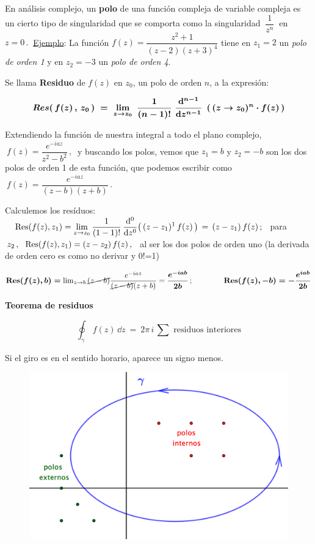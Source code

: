 En análisis complejo, un \textbf{polo} de una función compleja de variable compleja es un cierto tipo de singularidad que se comporta como la singularidad $\ \dfrac 1 {z^n} \ $ en $z = 0\, .  \ $ 
\underline{Ejemplo}: La función $f(z)=\dfrac{z^2+1}{(z-2)(z+3)^4}$ tiene en $z_1=2$ un \emph{polo de orden 1} y en $z_2=-3$ un \emph{polo de orden 4}.


Se llama \textbf{Residuo} de $f(z)$  en $z_0$, un polo de orden $n$, a la expresión:

$$\boldsymbol{ Res(\, f(z)\, , \, z_0\, ) \ = \ \lim_{z\to z_0}\ \dfrac 1{(n-1)!}\ \dv[n-1]{z} \ \left( \, (z \to z_0)^n \cdot f(z) \, \right) } $$

Extendiendo la función de nuestra integral a todo el plano complejo, $\ f(z)=\dfrac{e^{-iaz}}{z^2-b^2} \, , \ $ y buscando los polos, vemos que $z_1=b$ y $z_2=-b$ son los dos polos de orden 1 de esta función, que podemos escribir como $ \ f(z)=\dfrac{e^{-iaz}}{(z-b)(z+b)}\, .$

Calculemos los resíduos: $\quad \displaystyle \Res(f(z),z_1)=\lim_{z \to z_0} \dfrac 1{(1-1)!}\, \dv[0]{z} (\, (z-z_1)^1\, f(z) \, ) \, = \, (z-z_1)\, f(z)\, ; \ $ para $z_2\, , \ \ \Res(f(z),z_1) =  (z-z_2)\, f(z) \, , \ $ al ser los dos polos de orden uno \textcolor{gris}{(la derivada de orden cero es como no derivar y 0!=1)}
 

$\boldsymbol{ \Res(f(z),b)=}\lim_{z\to b} \cancel{(z-b)} \dfrac{e^{-iaz}}{\cancel{(z-b)}(z+b)}=\boldsymbol{\dfrac{e^{-iab}}{2b}}\, ; \qquad \qquad \boldsymbol{\Res(f(z),-b)=-\dfrac{e^{iab}}{2b}}$


\vspace{5mm}\textbf{Teorema de residuos}

\begin{multicols}{2}

$$\displaystyle \oint_\gamma \, f(z)\, \dd z \ = \ 2\pi\, i\, \sum \text{ residuos interiores}$$

Si el giro es en el sentido horario, aparece un signo menos.
 \begin{figure}[H]
	\centering
	\includegraphics[width=.35\textwidth]{imagenes/img43-01.png}
\end{figure}	
\end{multicols}


